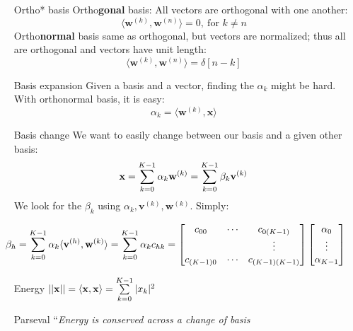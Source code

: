 \documentclass[11pt,a4paper]{article}
\begin{document}
\begin{itemize}
    \item[Ortho* basis]Ortho\textbf{gonal} basis: All vectors are orthogonal with one another:
    \[\langle\mathbf{w}^{(k)},\mathbf{w}^{(n)}\rangle = 0,\ \text{for } k\neq n \]
    Ortho\textbf{normal} basis same as orthogonal, but vectors are normalized; thus all are orthogonal and vectors have unit length: 
    \[\langle\mathbf{w}^{(k)},\mathbf{w}^{(n)}\rangle = \delta[n-k]\]
    \item[Basis expansion]Given a basis and a vector, finding the $\alpha_k$ might be hard. With orthonormal basis, it is easy: 
        \begin{equation}
            \alpha_k = \langle\mathbf{w}^{(k)}, \mathbf{x}\rangle
            \label{equ_basis expansion}
        \end{equation}
    \item[Basis change]We want to easily change between our basis and a given other basis:
    \[\mathbf{x} = \somme{K-1}{k=0}\alpha_k \mathbf{w}^{(k)} = \somme{K-1}{k=0}\beta_k \mathbf{v}^{(k)}\]
    We look for the $\beta_k$ using $\alpha_k, \mathbf{v}^{(k)}, \mathbf{w}^{(k)}$. Simply:
\end{itemize}
\begin{equation}
    \beta_h  = \somme{K-1}{k=0}\alpha_k \langle\mathbf{v}^{(h)}, \mathbf{w}^{(k)}\rangle = \somme{K-1}{k=0}\alpha_k c_{hk} = 
    \begin{bmatrix}
        c_{00}  &\cdots& c_{0(K-1)}\\
        & & \vdots\\
        c_{(K-1)0} & \cdots & c_{(K-1)(K-1)}
    \end{bmatrix}
    \begin{bmatrix}
        \alpha_0\\\vdots\\\alpha_{K-1}
    \end{bmatrix}
    \label{equ_basis change}
\end{equation}
\begin{itemize}


    \item[Energy]$||\mathbf{x}|| = \langle\mathbf{x},\mathbf{x}\rangle = \somme{K-1}{k=0}|x_k|^2$
    \item[Parseval]``\textit{Energy is conserved across a change of basis}
\end{itemize}
\end{document}
